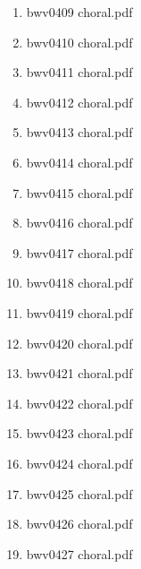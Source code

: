 \documentclass[11pt]{article}
\begin{document}
\begin{enumerate}
\begin{enumerate}
\begin{enumerate}
\begin{enumerate}
\item bwv0409 choral.pdf
\label{sec-1-1-1-1-44-6-7-2-4-156}

\item bwv0410 choral.pdf
\label{sec-1-1-1-1-44-6-7-2-4-157}

\item bwv0411 choral.pdf
\label{sec-1-1-1-1-44-6-7-2-4-158}

\item bwv0412 choral.pdf
\label{sec-1-1-1-1-44-6-7-2-4-159}

\item bwv0413 choral.pdf
\label{sec-1-1-1-1-44-6-7-2-4-160}

\item bwv0414 choral.pdf
\label{sec-1-1-1-1-44-6-7-2-4-161}

\item bwv0415 choral.pdf
\label{sec-1-1-1-1-44-6-7-2-4-162}

\item bwv0416 choral.pdf
\label{sec-1-1-1-1-44-6-7-2-4-163}

\item bwv0417 choral.pdf
\label{sec-1-1-1-1-44-6-7-2-4-164}

\item bwv0418 choral.pdf
\label{sec-1-1-1-1-44-6-7-2-4-165}

\item bwv0419 choral.pdf
\label{sec-1-1-1-1-44-6-7-2-4-166}

\item bwv0420 choral.pdf
\label{sec-1-1-1-1-44-6-7-2-4-167}

\item bwv0421 choral.pdf
\label{sec-1-1-1-1-44-6-7-2-4-168}

\item bwv0422 choral.pdf
\label{sec-1-1-1-1-44-6-7-2-4-169}

\item bwv0423 choral.pdf
\label{sec-1-1-1-1-44-6-7-2-4-170}

\item bwv0424 choral.pdf
\label{sec-1-1-1-1-44-6-7-2-4-171}

\item bwv0425 choral.pdf
\label{sec-1-1-1-1-44-6-7-2-4-172}

\item bwv0426 choral.pdf
\label{sec-1-1-1-1-44-6-7-2-4-173}

\item bwv0427 choral.pdf
\label{sec-1-1-1-1-44-6-7-2-4-174}


\end{enumerate}
\end{enumerate}
\end{enumerate}
\end{enumerate}
\end{document}
